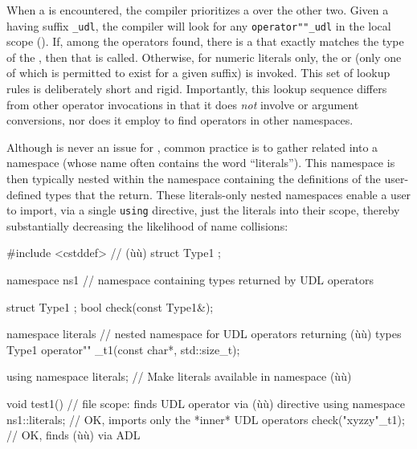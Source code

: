 When a  is encountered, the compiler prioritizes a
 over the other two. Given a
 having suffix \lstinline!_udl!, the compiler will look for
any \lstinline!operator""_udl! in the local scope (). If, among the operators found, there is a
 that exactly matches the type of
the , then that  is called.
Otherwise, for numeric literals only, the  or
 (only one of which is permitted to exist
for a given suffix) is invoked. This set of lookup rules is deliberately
short and rigid. Importantly, this lookup sequence differs from other
operator invocations in that it does \emph{not} involve  or argument conversions, nor does it employ
 to find operators in
other namespaces.

Although  is never an issue for , common
practice is to gather related  into a namespace
(whose name often contains the word ``literals''). This namespace is
then typically nested within the namespace containing the definitions of
the user-defined types that the  return. These
literals-only nested namespaces enable a user to import, via a single
\lstinline!using! directive, just the literals into their scope, thereby
substantially decreasing the likelihood of name collisions:

\begin{emcppshiddenlisting}[emcppsbatch=e8]
#include <cstddef>  // (ù{}ù)
struct Type1 {};
\end{emcppshiddenlisting}
\begin{emcppslisting}[emcppsbatch=e8]
namespace ns1  // namespace containing types returned by UDL operators
{
    struct Type1 { };
    bool check(const Type1&);

    namespace literals  // nested namespace for UDL operators returning (ù{}ù) types
    {
        Type1 operator"" _t1(const char*, std::size_t);
    }

    using namespace literals;  // Make literals available in namespace (ù{}ù)
}

void test1()  // file scope: finds UDL operator via (ù{}ù) directive
{
    using namespace ns1::literals;  // OK, imports only the *inner* UDL operators
    check("xyzzy"_t1);              // OK, finds (ù{}ù) via ADL
}
\end{emcppslisting}
    

